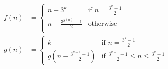 \documentclass{article}
\begin{document}
\thispagestyle{empty}

\begin{align*}
  f(n) &= \begin{cases}
    n- 3^k &\mbox{if } n = \frac{3^k - 1}{2} \\
    n - \frac{3^{g(n)} - 1}{2} & \mbox{otherwise}\\
  \end{cases}\\
  g(n) &= \begin{cases}
    k &\mbox{if } n = \frac{3^k - 1}{2} \\
    g(n - \frac{3^{k - 1} - 1}{2}) & \mbox{if } \frac{3^{k - 1} - 1}{2} \leq n \leq \frac{3^k - 1}{2}
  \end{cases}\\
\end{align*}
\end{document}
